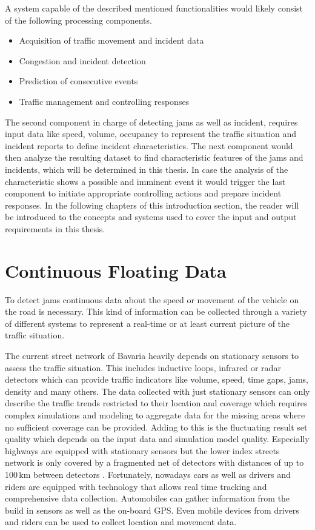 A system capable of the described mentioned functionalities would likely consist of the following processing components.

\begin{itemize}
  \item Acquisition of traffic movement and incident data
  \item Congestion and incident detection
  \item Prediction of consecutive events
  \item Traffic management and controlling responses
\end{itemize}

The second component in charge of detecting \glspl{jam} as well as incident, requires input data like speed, volume, occupancy to represent the traffic situation and incident reports to define incident characteristics. The next component would then analyze the resulting dataset to find characteristic features of the jams and incidents, which will be determined in this thesis. In case the analysis of the characteristic shows a possible and imminent event it would trigger the last component to initiate appropriate controlling actions and prepare incident responses. In the following chapters of this introduction section, the reader will be introduced to the concepts and systems used to cover the input and output requirements in this thesis.

\section{Continuous Floating Data}
\label{introduction_continuous_floating_data}
To detect \glspl{jam} continuous data about the speed or movement of the vehicle on the road is necessary. This kind of information can be collected through a variety of different systems to represent a real-time or at least current picture of the traffic situation. 

The current street network of Bavaria heavily depends on stationary sensors to assess the traffic situation. This includes inductive loops, infrared or radar detectors which can provide traffic indicators like volume, speed, time gaps, jams, density and many others. The data collected with just stationary sensors can only describe the traffic trends restricted to their location and coverage which requires complex simulations and modeling to aggregate data for the missing areas where no sufficient coverage can be provided. Adding to this is the fluctuating result set quality which depends on the input data and simulation model quality. Especially highways are equipped with stationary sensors but the lower index streets network is only covered by a fragmented net of detectors with distances of up to 100\,km between detectors \parencite{INDRIX2015}. Fortunately, nowadays cars as well as drivers and riders are equipped with technology that allows real time tracking and comprehensive data collection. Automobiles can gather information from the build in sensors as well as the on-board GPS. Even mobile devices from drivers and riders can be used to collect location and movement data. \parencite{Randelhoff2016}

